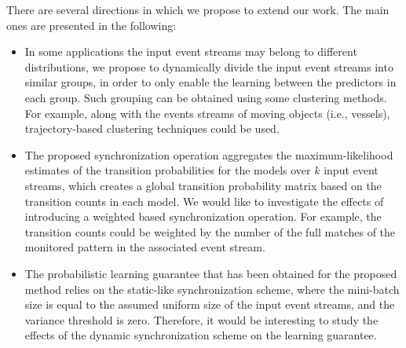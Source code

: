 There are several directions in which we propose to extend our work. The main ones are presented in the following:

\begin{itemize}[noitemsep]
	
\item In some applications the input event streams may belong to different distributions, we propose to dynamically divide the input event streams into similar groups, in order to only enable the learning between the predictors in each group.  Such grouping can be obtained using some clustering methods. For example, along with the events streams of moving objects (i.e., vessels), trajectory-based clustering techniques \cite{lee2007trajectory,liu2014knowledge} could be used.
 
\item  The proposed synchronization operation aggregates the maximum-likelihood estimates of the transition probabilities for the \pmcmr models over $k$ input event streams, which creates a global transition probability matrix based on the transition counts in each model. We would like to investigate the effects of introducing a weighted based synchronization operation. For example, the transition counts could be weighted by the number of the full matches of the monitored pattern in the associated event stream. 

\item The probabilistic learning guarantee that has been obtained for the proposed method relies on the static-like synchronization scheme, where the mini-batch size is equal to the assumed uniform size of the input event streams, and the variance threshold is zero. Therefore, it would be interesting to study the effects of the dynamic synchronization scheme on the learning guarantee.
\end{itemize}
%	
%	
%	
%	


